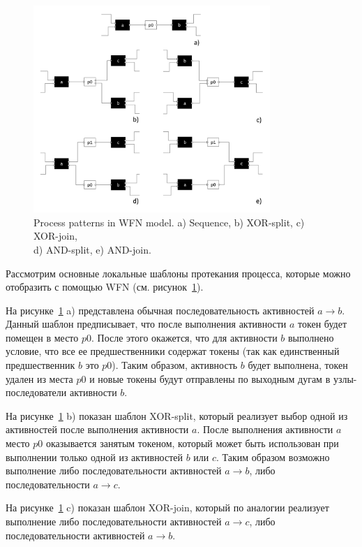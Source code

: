 \documentclass[
11pt,%
tightenlines,%
twoside,%
onecolumn,%
nofloats,%
nobibnotes,%
nofootinbib,%
superscriptaddress,%
noshowpacs,%
centertags]%
{revtex4}
\begin{document}
\begin{figure}[h]
\setcaptionmargin{5mm}
\onelinecaptionsfalse %
\includegraphics[width=0.8\textwidth]{pics/wfn-patterns.pdf}
\caption{Process patterns in WFN model. a) Sequence, b) XOR-split, c) XOR-join,\\d) AND-split, e) AND-join.}
\label{fig:wfn-patterns}
\end{figure}

Рассмотрим основные локальные шаблоны протекания процесса, которые можно отобразить с помощью WFN (см. рисунок~\ref{fig:wfn-patterns}).

На рисунке~\ref{fig:wfn-patterns} a) представлена обычная последовательность активностей $a \rightarrow b$.
Данный шаблон предписывает, что после выполнения активности $a$ токен будет помещен в место $p0$.
После этого окажется, что для активности $b$ выполнено условие, что все ее предшественники содержат токены (так как единственный предшественник $b$ это $p0$).
Таким образом, активность $b$ будет выполнена, токен удален из места $p0$ и новые токены будут отправлены по выходным дугам в узлы-последователи активности $b$.
     
На рисунке~\ref{fig:wfn-patterns} b) показан шаблон XOR-split, который реализует выбор одной из активностей после выполнения активности $a$.
После выполнения активности $a$ место $p0$ оказывается занятым токеном, который может быть использован при выполнении только одной из активностей $b$ или $c$.
Таким образом возможно выполнение либо последовательности активностей $a \rightarrow b$, либо последовательности $a \rightarrow c$.

На рисунке~\ref{fig:wfn-patterns} c) показан шаблон XOR-join, который по аналогии реализует выполнение либо последовательности активностей $a \rightarrow c$, либо последовательности активностей $a \rightarrow b$.
\end{document}
